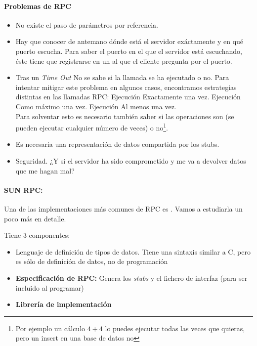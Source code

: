 \paragraph{Problemas de RPC}
\begin{itemize}
	\item No existe el paso de parámetros por referencia.
	\item Hay que conocer de antemano dónde está el servidor exáctamente y en qué puerto escucha.
	\subitem Para saber el puerto en el que el servidor está escuchando, éste tiene que registrarse en un  al que el cliente pregunta por el puerto.
 	\item Tras un \textit{Time Out} No se sabe si la llamada se ha ejecutado o no. Para intentar mitigar este problema en algunos casos, encontramos estrategias distintas en las llamadas RPC:
		\subitem Ejecución Exactamente una vez.
		\subitem Ejecución Como máximo una vez.
		\subitem Ejecución Al menos una vez.\\
	Para solventar esto es necesario también saber si las operaciones son  (se pueden ejecutar cualquier número de veces) o no\footnote{Por ejemplo un cálculo $4+4$ lo puedes ejecutar todas las veces que quieras, pero un insert en una base de datos no}.
	\item Es necesaria una representación de datos compartida por los stubs.
	\item Seguridad. ¿Y si el servidor ha sido comprometido y me va a devolver datos que me hagan mal?
\end{itemize}


\paragraph{SUN RPC: } Una de las implementaciones más comunes de RPC es . Vamos a estudiarla un poco más en detalle.


Tiene 3 componentes:
\begin{itemize}
	\item {} Lenguaje de definición de tipos de datos. Tiene una sintaxis similar a C, pero es sólo de definición de datos, no de programación
	\item \textbf{Especificación de RPC: } Genera los \textit{stubs} y el fichero de interfaz (para ser incluido al programar)
	\item \textbf{Librería de implementación}
\end{itemize}

